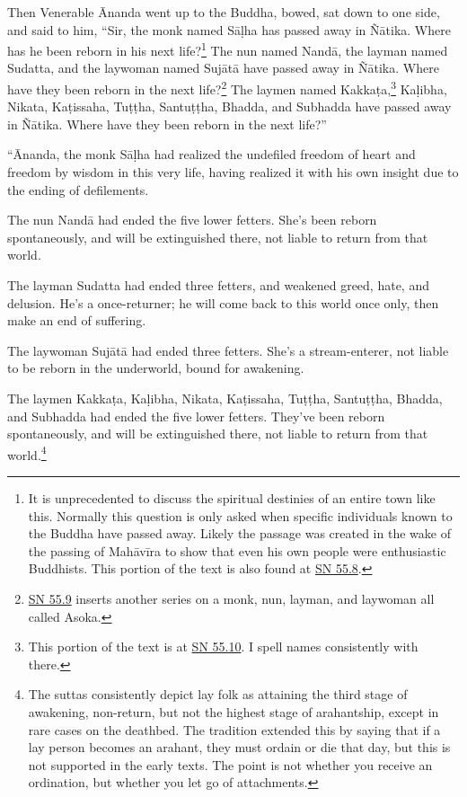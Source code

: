 \documentclass[12pt,openany]{book}%
\begin{document}
Then Venerable Ānanda went up to the Buddha, bowed, sat down to one side, and said to him, “Sir, the monk named \textsanskrit{Sāḷha} has passed away in \textsanskrit{Ñātika}. Where has he been reborn in his next life?\footnote{It is unprecedented to discuss the spiritual destinies of an entire town like this. Normally this question is only asked when specific individuals known to the Buddha have passed away. Likely the passage was created in the wake of the passing of \textsanskrit{Mahāvīra} to show that even his own people were enthusiastic Buddhists. This portion of the text is also found at \href{https://suttacentral.net/sn55.8/en/sujato}{SN 55.8}. } The nun named \textsanskrit{Nandā}, the layman named Sudatta, and the laywoman named \textsanskrit{Sujātā} have passed away in \textsanskrit{Ñātika}. Where have they been reborn in the next life?\footnote{\href{https://suttacentral.net/sn55.9/en/sujato}{SN 55.9} inserts another series on a monk, nun, layman, and laywoman all called Asoka. } The laymen named \textsanskrit{Kakkaṭa},\footnote{This portion of the text is at \href{https://suttacentral.net/sn55.10/en/sujato}{SN 55.10}. I spell names consistently with there. } \textsanskrit{Kaḷibha}, Nikata, \textsanskrit{Kaṭissaha}, \textsanskrit{Tuṭṭha}, \textsanskrit{Santuṭṭha}, Bhadda, and Subhadda have passed away in \textsanskrit{Ñātika}. Where have they been reborn in the next life?” 

“Ānanda, the monk \textsanskrit{Sāḷha} had realized the undefiled freedom of heart and freedom by wisdom in this very life, having realized it with his own insight due to the ending of defilements. 

The nun \textsanskrit{Nandā} had ended the five lower fetters. She’s been reborn spontaneously, and will be extinguished there, not liable to return from that world. 

The layman Sudatta had ended three fetters, and weakened greed, hate, and delusion. He’s a once-returner; he will come back to this world once only, then make an end of suffering. 

The laywoman \textsanskrit{Sujātā} had ended three fetters. She’s a stream-enterer, not liable to be reborn in the underworld, bound for awakening. 

The laymen \textsanskrit{Kakkaṭa}, \textsanskrit{Kaḷibha}, Nikata, \textsanskrit{Kaṭissaha}, \textsanskrit{Tuṭṭha}, \textsanskrit{Santuṭṭha}, Bhadda, and Subhadda had ended the five lower fetters. They’ve been reborn spontaneously, and will be extinguished there, not liable to return from that world.\footnote{The suttas consistently depict lay folk as attaining the third stage of awakening, non-return, but not the highest stage of arahantship, except in rare cases on the deathbed. The tradition extended this by saying that if a lay person becomes an arahant, they must ordain or die that day, but this is not supported in the early texts. The point is not whether you receive an ordination, but whether you let go of attachments. } 
\end{document}
